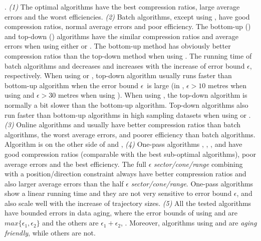 {.
\emph{(1)} The optimal algorithms have the best compression ratios, large average errors and the worst efficiencies.
%
\emph{(2)} Batch algorithms, except \dpa using \dad, have good compression ratios, normal average errors and poor efficiency.
%
The bottom-up (\tpa) and top-down (\dpa) algorithms have the similar compression ratios and average errors when using either \ped or \sed. The bottom-up method has obviously better compression ratios than the top-down method when using \dad.
%
The running time of batch algorithms \dpa and \tpa decreases and increases with the increase of error bound $\epsilon$, respectively. When using \ped or \sed, top-down algorithm \dpa usually runs faster than bottom-up algorithm \tpa when the error bound $\epsilon$~is large  (\eg in \geolife, $\epsilon >10$ metres when using \ped and $\epsilon >30$ metres when using \sed). When using \dad, the top-down algorithm is normally a bit slower than the bottom-up algorithm.
Top-down algorithms also run faster than bottom-up algorithms in high sampling datasets when using \ped or \sed.
%
\emph{(3)} Online algorithms \opwa and \bqsa usually have better compression ratios than batch algorithms, the worst average errors, and poorer efficiency than batch algorithms. Algorithm \squishe is on the other side of \opwa and \bqsa, 
%
\emph{(4)} One-pass algorithms \operb, \siped, \cised, \intersec and \interval have good compression ratios (comparable with the best sub-optimal algorithms), poor average errors and the best efficiency. 
%
The full $\epsilon$ \emph{sector/cone/range} combining with a position/direction constraint always have better compression ratios and also larger average errors than the half $\epsilon$ \emph{sector/cone/range}. %
%
One-pass algorithms show a linear running time and they are not very sensitive to error bound $\epsilon$, and also scale well with the increase of trajectory sizes.
%
\emph{(5)} {All the tested algorithms have bounded errors in data aging, where the error bounds of \dpa using \ped and \sed are $max\{\epsilon_1, \epsilon_2\}$ and the others are $\epsilon_1 + \epsilon_2$, . Moreover, algorithms \dpa using \ped and \sed are \emph{aging friendly}, while others are not. }

}
